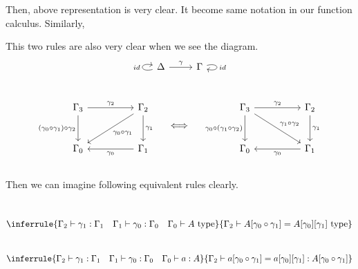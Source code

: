 \documentclass[12pt, a4paper, openany, twoside]{book}
\theoremstyle{definition}
\theoremstyle{remark}
\theoremstyle{plain}
\numberwithin{equation}{section}
\begin{document}
Then, above representation is very clear. It become same notation in our function calculus. Similarly, 
\begin{tcolorbox}[colback=yellow!10!white,colframe=green!75!black,title=Construction 1.3.5.]
\end{tcolorbox}
This two rules are also very clear when we see the diagram. 
\[
\begin{tikzcd}
{\Delta} \arrow[loop left, "id"] \arrow[r, "\gamma"] & {\Gamma} \arrow[loop right, "id"]
\end{tikzcd}
\]
\\
\[
\begin{tikzcd}[row sep = large, column sep = huge]
    {\Gamma_3} \arrow[r, "\gamma_2"]  \arrow[d, "(\gamma_0 \circ \gamma_1) \circ \gamma_2"'] & {\Gamma_2}\arrow[ld, "\gamma_0 \circ \gamma_1"] \arrow[d, "\gamma_1"] \\
    {\Gamma_0} & {\Gamma_1} \arrow[l, "\gamma_0"] 
\end{tikzcd}
\quad
\iff
\quad
\begin{tikzcd}[row sep = large, column sep = huge]
{\Gamma_3} \arrow[r, "\gamma_2"] \arrow[rd, "\gamma_1 \circ \gamma_2"] \arrow[d, "\gamma_0 \circ (\gamma_1 \circ \gamma_2)"'] & {\Gamma_2} \arrow[d, "\gamma_1"] \\
{\Gamma_0} & {\Gamma_1} \arrow[l, "\gamma_0"] 
\end{tikzcd}
\]
\\
Then we can imagine following equivalent rules clearly. 
\begin{tcolorbox}[colback=yellow!10!white,colframe=green!75!black,title=Construction 1.3.6.]
\\
\[
\inferrule
{\Gamma_2 \vdash \gamma_1 : \Gamma_1 \quad \Gamma_1 \vdash \gamma_0 : \Gamma_0 \quad \Gamma_0 \vdash A \text{ type}}
{\Gamma_2 \vdash A[\gamma_0 \circ \gamma_1] = A[\gamma_0][\gamma_1] \text{ type}}
\]
\\
\[
\inferrule
{\Gamma_2 \vdash \gamma_1 : \Gamma_1 \quad \Gamma_1 \vdash \gamma_0 : \Gamma_0 \quad \Gamma_0 \vdash a : A}
{\Gamma_2 \vdash a[\gamma_0 \circ \gamma_1] = a[\gamma_0][\gamma_1] : A[\gamma_0 \circ \gamma_1]}
\]
\end{tcolorbox}
\end{document}
